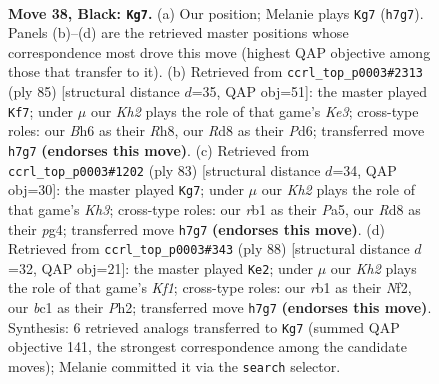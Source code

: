 \documentclass[11pt]{article}
\begin{document}
\clearpage

\begin{figure}[p]\centering
\begin{subfigure}{0.46\textwidth}\centering
\resizebox{\linewidth}{!}{%
\newchessgame
\chessboard[
  setfen={3r4/p6k/Pp2B2b/5p2/4pP1n/8/5K2/1RB5 b - - 9 38},
  showmover=false,
  pgfstyle=straightmove, color=movearrow, markmove={h7-g7}
]}
\caption{}
\end{subfigure}\hfill
\begin{subfigure}{0.46\textwidth}\centering
\resizebox{\linewidth}{!}{%
\newchessgame
\chessboard[
  setfen={7r/8/3pk2P/p4p2/n6K/5P2/Pp1BP3/1R6 b - - 3 43},
  showmover=false,
  pgfstyle=straightmove, color=movearrow, markmove={e6-f7}
]}
\caption{}
\end{subfigure}
\\[4pt]
\begin{subfigure}{0.46\textwidth}\centering
\resizebox{\linewidth}{!}{%
\newchessgame
\chessboard[
  setfen={8/5p2/4p2k/p7/b1BK1PP1/8/1P2R3/1r6 b - - 0 42},
  showmover=false,
  pgfstyle=straightmove, color=movearrow, markmove={h6-g7}
]}
\caption{}
\end{subfigure}\hfill
\begin{subfigure}{0.46\textwidth}\centering
\resizebox{\linewidth}{!}{%
\newchessgame
\chessboard[
  setfen={8/7R/1k1p4/4b2p/3pP3/1r4P1/5N1P/5K2 w - - 0 45},
  showmover=false,
  pgfstyle=straightmove, color=movearrow, markmove={f1-e2}
]}
\caption{}
\end{subfigure}
\caption{\textbf{Move 38, Black: \texttt{Kg7}.} (a) Our position; Melanie plays \texttt{Kg7} (\texttt{h7g7}). Panels (b)--(d) are the retrieved master positions whose correspondence most drove this move (highest QAP objective among those that transfer to it). (b) Retrieved from \texttt{ccrl\_top\_p0003\#2313} (ply 85) [structural distance $d$=35, QAP obj=51]: the master played \texttt{Kf7}; under $\mu$ our \emph{Kh2} plays the role of that game's \emph{Ke3}; cross-type roles: our \emph{B}h6 as their \emph{R}h8, our \emph{R}d8 as their \emph{P}d6; transferred move \texttt{h7g7} \textbf{(endorses this move)}. (c) Retrieved from \texttt{ccrl\_top\_p0003\#1202} (ply 83) [structural distance $d$=34, QAP obj=30]: the master played \texttt{Kg7}; under $\mu$ our \emph{Kh2} plays the role of that game's \emph{Kh3}; cross-type roles: our \emph{r}b1 as their \emph{P}a5, our \emph{R}d8 as their \emph{p}g4; transferred move \texttt{h7g7} \textbf{(endorses this move)}. (d) Retrieved from \texttt{ccrl\_top\_p0003\#343} (ply 88) [structural distance $d$=32, QAP obj=21]: the master played \texttt{Ke2}; under $\mu$ our \emph{Kh2} plays the role of that game's \emph{Kf1}; cross-type roles: our \emph{r}b1 as their \emph{N}f2, our \emph{b}c1 as their \emph{P}h2; transferred move \texttt{h7g7} \textbf{(endorses this move)}. Synthesis: 6 retrieved analogs transferred to \texttt{Kg7} (summed QAP objective 141, the strongest correspondence among the candidate moves); Melanie committed it via the \texttt{search} selector.}
\label{fig:thought-m75}
\end{figure}
\end{document}
